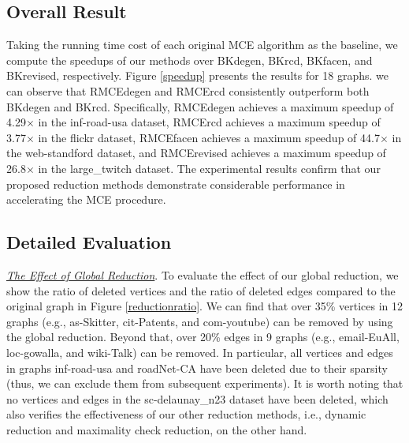 \documentclass[sigconf, nonacm]{acmart}
\begin{document}
\subsection{Overall Result}
Taking the running time cost of each original MCE algorithm as the baseline, we compute the speedups of our methods over BKdegen, BKrcd, BKfacen, and BKrevised, respectively. Figure \ref{speedup} presents the results for 18 graphs. 
we can observe that RMCEdegen and RMCErcd consistently outperform both BKdegen and BKrcd. Specifically, RMCEdegen achieves a maximum speedup of 4.29$\times$ in the inf-road-usa dataset,  RMCErcd achieves a maximum speedup of 3.77$\times$  in the flickr dataset,  RMCEfacen achieves a maximum speedup of 44.7$\times$ in the web-standford dataset, and RMCErevised achieves a maximum speedup of 26.8$\times$ in the large\_twitch dataset. 
The experimental results confirm that our proposed reduction methods demonstrate considerable performance in accelerating the MCE procedure.

\subsection{Detailed Evaluation}
\noindent\textit{{\underline{The Effect of Global Reduction}}}. To evaluate the effect of our global reduction, we show the ratio of deleted vertices and the ratio of deleted edges compared to the original graph in Figure \ref{reductionratio}.
We can find that over 35\% vertices in 12 graphs (e.g., as-Skitter, cit-Patents, and com-youtube) can be removed by using the global reduction. Beyond that, over 20\% edges in 9 graphs (e.g., email-EuAll, loc-gowalla, and wiki-Talk) can be removed. In particular, all vertices and edges in graphs inf-road-usa  and roadNet-CA have been deleted due to their sparsity (thus, we can exclude them from subsequent experiments). It is worth noting that no vertices and edges in the sc-delaunay\_n23 dataset have been deleted, which also verifies the effectiveness of our other reduction methods, i.e., dynamic reduction and maximality check
reduction, on the other hand. 
\end{document}
